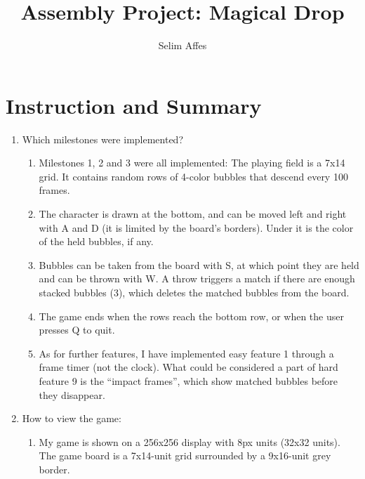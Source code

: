 \documentclass{article}
\title{Assembly Project: Magical Drop}
\author{Selim Affes}
\begin{document}
\maketitle

\section{Instruction and Summary}

\begin{enumerate}
\item Which milestones were implemented?
\begin{enumerate}
\item Milestones 1, 2 and 3 were all implemented: The playing field is a 7x14 grid. It contains random rows of 4-color bubbles that descend every 100 frames.

\item The character is drawn at the bottom, and can be moved left and right with A and D (it is limited by the board's borders). Under it is the color of the held bubbles, if any.

\item Bubbles can be taken from the board with S, at which point they are held and can be thrown with W. A throw triggers a match if there are enough stacked bubbles (3), which deletes the matched bubbles from the board.

\item The game ends when the rows reach the bottom row, or when the user presses Q to quit.

\item As for further features, I have implemented easy feature 1 through a frame timer (not the clock). What could be considered a part of hard feature 9 is the ``impact frames'', which show matched bubbles before they disappear.
\end{enumerate}
\item How to view the game:
\begin{enumerate}
\item My game is shown on a 256x256 display with 8px units (32x32 units). The game board is a 7x14-unit grid surrounded by a 9x16-unit grey border.


\end{enumerate}
\end{enumerate}
\end{document}
